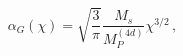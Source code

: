 \begin{equation} \alpha_G(\chi) = \sqrt{\frac{{3}}{{\pi}}} \frac{
M_s}{M_P^{(4d)}} \chi^{3/2}\, , \label{rge2}\end{equation}

